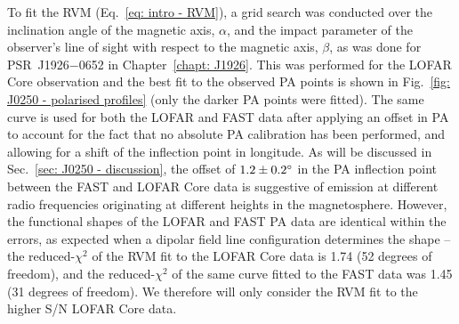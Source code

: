 To fit the RVM (Eq.~\eqref{eq: intro - RVM}), a grid search was conducted over the inclination angle of the magnetic axis, $\alpha$, and the impact parameter of the observer's line of sight with respect to the magnetic axis, $\beta$, as was done for PSR~J1926$-$0652 in Chapter~\ref{chapt: J1926}. This was performed for the LOFAR Core observation and the best fit to the observed PA points is shown in Fig.~\ref{fig: J0250 - polarised profiles} (only the darker PA points were fitted). The same curve is used for both the LOFAR and FAST data after applying an offset in PA to account for the fact that no absolute PA calibration has been performed, and allowing for a shift of the inflection point in longitude. As will be discussed in Sec.~\ref{sec: J0250 - discussion}, the offset of $1.2\pm0.2^\circ$ in the PA inflection point between the FAST and LOFAR Core data is suggestive of emission at different radio frequencies originating at different heights in the magnetosphere. However, the functional shapes of the LOFAR and FAST PA data are identical within the errors, as expected when a dipolar field line configuration determines the shape -- the reduced-$\chi^2$ of the RVM fit to the LOFAR Core data is 1.74 (52 degrees of freedom), and the reduced-$\chi^2$ of the same curve fitted to the FAST data was 1.45 (31 degrees of freedom). We therefore will only consider the RVM fit to the higher S/N LOFAR Core data. 

